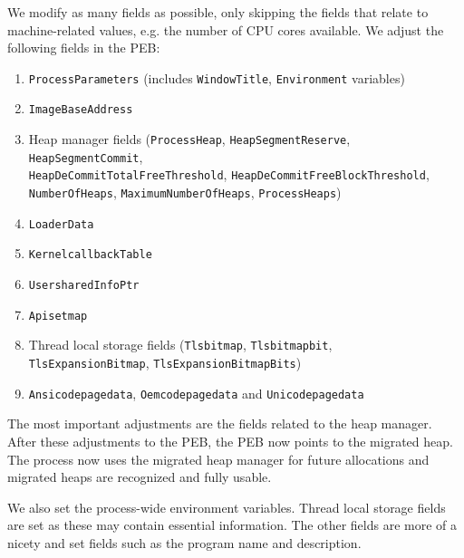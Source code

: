 \documentclass[a4paper, 11pt, english]{report}
\begin{document}
We modify as many fields as possible, only skipping the fields that relate to machine-related values, e.g. the number of CPU cores available.
We adjust the following fields in the PEB:
\begin{enumerate}
	\item \texttt{ProcessParameters} (includes \texttt{WindowTitle}, \texttt{Environment} variables)
	\item \texttt{ImageBaseAddress}
	\item Heap manager fields (\texttt{ProcessHeap}, \texttt{HeapSegmentReserve},\\ \texttt{HeapSegmentCommit}, \\ \texttt{HeapDeCommitTotalFreeThreshold}, \texttt{HeapDeCommitFreeBlockThreshold}, \texttt{NumberOfHeaps}, \texttt{MaximumNumberOfHeaps}, \texttt{ProcessHeaps})
	\item \texttt{LoaderData}
	\item \texttt{KernelcallbackTable}
	\item \texttt{UsersharedInfoPtr}
	\item \texttt{Apisetmap}
	\item Thread local storage fields (\texttt{Tlsbitmap}, \texttt{Tlsbitmapbit},\\ \texttt{TlsExpansionBitmap}, \texttt{TlsExpansionBitmapBits})
	\item \texttt{Ansicodepagedata}, \texttt{Oemcodepagedata} and \texttt{Unicodepagedata}
\end{enumerate}

The most important adjustments are the fields related to the heap manager.
After these adjustments to the PEB, the PEB now points to the migrated heap.
The process now uses the migrated heap manager for future allocations and migrated heaps are recognized and fully usable. 

We also set the process-wide environment variables. Thread local storage fields are set as these may contain essential information.
The other fields are more of a nicety and set fields such as the program name and description. 
\end{document}
